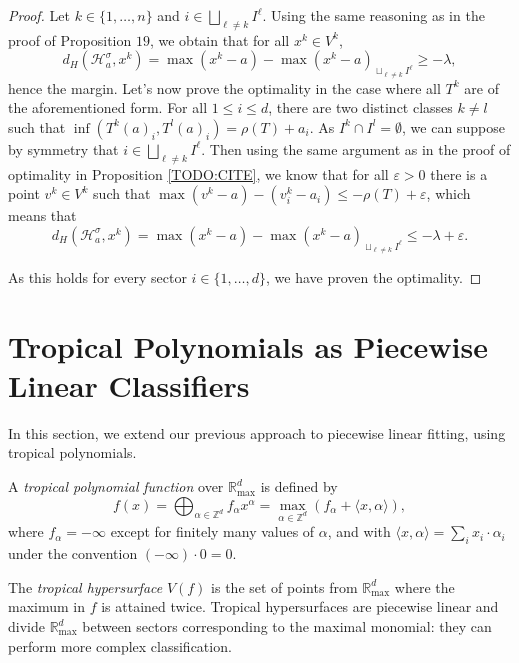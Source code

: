 \documentclass[oneside,english,a4paper]{amsart}
\numberwithin{equation}{section}
\numberwithin{figure}{section}
\theoremstyle{plain}
\theoremstyle{definition}
\theoremstyle{plain}
\theoremstyle{remark}
\theoremstyle{plain}
\theoremstyle{definition}
\theoremstyle{definition}
\begin{document}
\begin{proof}
Let $k\in\{1,\ldots, n\}$ and $i\in\bigsqcup_{\ell\ne k}I^{\ell}$. Using the same reasoning
as in the proof of Proposition $19$, we obtain that for all $x^{k}\in V^{k}$,
\[
d_H(\mathcal{H}_{a}^{\sigma},x^{k})=\max(x^{k}-a)-\max(x^{k}-a)_{\sqcup_{\ell\ne k}I^{\ell}}\ge-\lambda,
\]
hence the margin. Let's now prove the optimality in the case where
all $T^{k}$ are of the aforementioned form. For all $1\le i\le d$, there are two distinct classes $k\ne l$
such that $\inf(T^{k}(a)_{i}, T^{l}(a)_{i})=\rho(T)+a_{i}$. As $I^{k}\cap I^{l}=\emptyset$,
we can suppose by symmetry that $i\in\bigsqcup_{\ell\ne k}I^{\ell}.$ Then using
the same argument as in the proof of optimality in Proposition \ref{TODO:CITE},
we know that for all $\varepsilon>0$ there is a point $v^{k}\in V^{k}$
such that $\max(v^{k}-a)-(v_{i}^{k}-a_{i})\le-\rho(T)+\varepsilon$,
which means that 
\[
d_H(\mathcal{H}_{a}^{\sigma},x^{k})=\max(x^{k}-a)-\max(x^{k}-a)_{\sqcup_{\ell\ne k}I^{\ell}}\le-\lambda+\varepsilon.
\]

As this holds for every sector $i\in\{1,\ldots, d\}$, we have proven the optimality. 
\end{proof}

\section{Tropical Polynomials as Piecewise Linear Classifiers}

In this section, we extend our previous approach to piecewise linear
fitting, using tropical polynomials. 

A \emph{tropical polynomial} \emph{function} over $\mathbb{R}_{\max}^{d}$
is defined by
\[
f(x)=\bigoplus_{\alpha\in\mathbb{Z}^{d}}f_{\alpha}x^{\alpha}=\max_{\alpha\in\mathbb{Z}^{d}}\left(f_{\alpha}+\langle x,\alpha\rangle\right),
\]
where $f_{\alpha}=-\infty$ except for finitely many values of $\alpha$,
and with $\langle x,\alpha\rangle=\sum_{i}x_{i}\cdot\alpha_{i}$ under
the convention $(-\infty)\cdot0=0$.

The \emph{tropical hypersurface} $V(f)$ is the set of points from
$\mathbb{R}_{\max}^{d}$ where the maximum in $f$ is attained twice.
Tropical hypersurfaces are piecewise linear and divide $\mathbb{R}_{\max}^{d}$
between sectors corresponding to the maximal monomial: they can perform
more complex classification.
\end{document}
